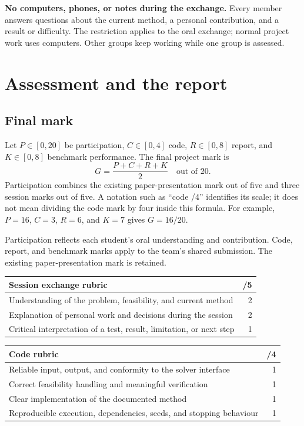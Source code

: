\documentclass[11pt,a4paper]{article}
\begin{document}
\textbf{No computers, phones, or notes during the exchange.} Every member answers questions about the current method, a personal contribution, and a result or difficulty. The restriction applies to the oral exchange; normal project work uses computers. Other groups keep working while one group is assessed.

\section{Assessment and the report}
\subsection{Final mark}
Let $P\in[0,20]$ be participation, $C\in[0,4]$ code, $R\in[0,8]$ report, and $K\in[0,8]$ benchmark performance. The final project mark is
\[
\boxed{G=\frac{P+C+R+K}{2}\quad\text{out of 20}.}
\]
Participation combines the existing paper-presentation mark out of five and three session marks out of five. A notation such as ``code /4'' identifies its scale; it does not mean dividing the code mark by four inside this formula. For example, $P=16$, $C=3$, $R=6$, and $K=7$ gives $G=16/20$.

Participation reflects each student's oral understanding and contribution. Code, report, and benchmark marks apply to the team's shared submission. The existing paper-presentation mark is retained.


\begin{center}\begin{tabular}{p{10.9cm}r}\toprule
Session exchange rubric & /5\\\midrule
Understanding of the problem, feasibility, and current method & 2\\
Explanation of personal work and decisions during the session & 2\\
Critical interpretation of a test, result, limitation, or next step & 1\\\bottomrule
\end{tabular}\end{center}
\begin{center}\begin{tabular}{p{10.9cm}r}\toprule
Code rubric & /4\\\midrule
Reliable input, output, and conformity to the solver interface & 1\\
Correct feasibility handling and meaningful verification & 1\\
Clear implementation of the documented method & 1\\
Reproducible execution, dependencies, seeds, and stopping behaviour & 1\\\bottomrule
\end{tabular}\end{center}
\end{document}
